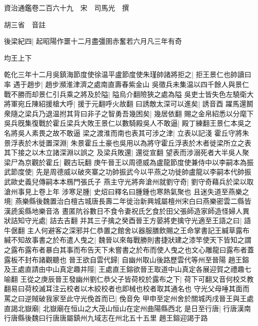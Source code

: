 資治通鑑卷二百六十九　宋　司馬光　撰

胡三省　音註

後梁紀四|{
	起昭陽作噩十二月盡彊圉赤奮若六月凡三年有奇}


均王上下

乾化三年十二月吳鎮海節度使徐温平盧節度使朱瑾帥諸將拒之|{
	拒王景仁也帥讀曰率}
遇于趙步|{
	趙步瀕淮津濟之處南直壽春紫金山}
吳徵兵未集温以四千餘人與景仁戰不勝而却景仁引兵乘之將及於隘|{
	隘烏介翻險狹之處為隘}
吳吏士皆失色左驍衛大將軍宛丘陳紹援槍大呼|{
	援于元翻呼火故翻}
曰誘敵太深可以進矣|{
	誘音酉}
躍馬還鬭衆隨之梁兵乃退温拊其背曰非子之智勇吾幾困矣|{
	幾居依翻}
賜之金帛紹悉以分麾下吳兵旣集復戰於霍丘梁兵大敗王景仁以數騎殿吳人不敢逼|{
	殿丁練翻王景仁本吳之名將吳人素畏之故不敢逼}
梁之渡淮而南也表其可涉之津|{
	立表以記淺}
霍丘守將朱景浮表於木徙置深淵|{
	朱景霍丘土豪也吳用以為將守霍丘浮表於木者徙梁所立之表其下接之以木立諸深淵以誤之}
及梁兵敗還|{
	還從宣翻}
望表而涉溺死者大半吳人聚梁尸為京觀於霍丘|{
	觀古玩翻}
庚午晉王以周德威為盧龍節度使兼侍中以李嗣本為振武節度使|{
	先是周德威以破夾寨之功帥振武今以平燕之功徙帥盧龍以李嗣本代帥振武歐史義兒傳嗣本本鴈門張氏子}
燕主守光將奔滄州就劉守奇|{
	劉守奇藉兵於梁以取滄州事見上卷上年}
涉寒足腫|{
	史炤曰釋名曰腫鍾也寒熱氣聚也}
且迷失道至燕樂之境|{
	燕樂縣後魏置治白檀古城唐長壽二年徙治新興城屬檀州宋白曰燕樂密雲二縣皆漢虒奚縣地樂音洛}
晝匿阬谷數日不食令妻祝氏乞食於田父張師造家師造怪婦人異狀詰知守光處|{
	詰去吉翻}
并其三子擒之癸酉晉王方晏將吏擒守光適至王語之曰|{
	語牛倨翻}
主人何避客之深邪并仁恭置之館舍以器服膳飲賜之王命掌書記王緘草露布緘不知故事書之於布遣人曳之|{
	魏晉以來每戰勝則書捷狀建之漆竿使天下皆知之謂之露布露布者暴白其事而布告天下未嘗書之於布而使人曳之也文心雕龍曰露布者蓋露板不封布諸觀聽也}
晉王欲自雲代歸|{
	自幽州取山後路歷雲代等州至晉陽}
趙王鎔及王處直請由中山真定趣井陘|{
	王處直王鎔欲晉王取道中山真定各展迎賀之禮趣七喻翻}
王從之庚辰晉王發幽州劉仁恭父子皆荷校於露布之下|{
	荷下可翻又音何校爻教翻易曰荷校滅耳注云校者以木絞校者也即械也校者取其通名也}
守光父母唾其面而罵之曰逆賊破我家至此守光俛首而已|{
	俛音免}
甲申至定州舍於關城丙戌晉王與王處直謁北嶽廟|{
	北嶽廟在恒山之大茂山恒山在定州曲陽縣西北}
是日至行唐|{
	行唐漢南行唐縣後魏曰行唐唐屬鎮州九域志在州北五十五里}
趙王鎔迎謁于路

